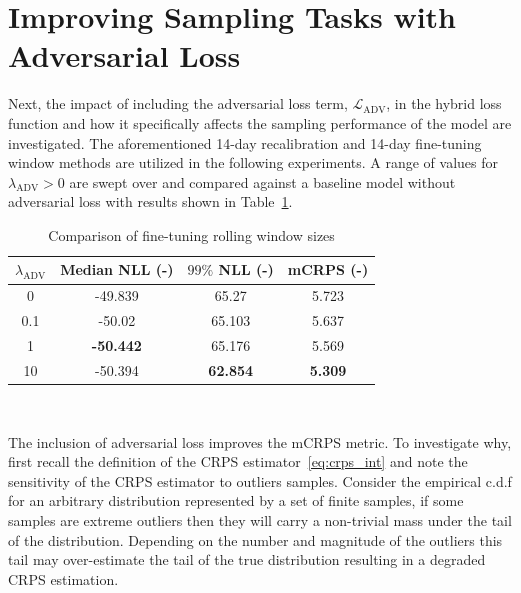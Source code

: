 \section{Improving Sampling Tasks with Adversarial Loss}\label{sec:improving-sampling-tasks}

Next, the impact of including the adversarial loss term, $\mathcal{L}_{\text{ADV}}$, in the hybrid loss function and
how it specifically affects the sampling performance of the model are investigated.
The aforementioned 14-day recalibration and 14-day fine-tuning window methods are utilized in the following experiments.
A range of values for $\lambda_{\text{ADV}} > 0$ are swept over and compared against a baseline model without adversarial
loss with results shown in Table~\ref{tab:ganloss}.

\begin{table}[htb]
    \caption[Results of adversarial loss inclusion]{
        Comparison of fine-tuning rolling window sizes
    }
    \begin{center}
        \begin{tabular}{||c|c|c|c||} \hline
        $\lambda_{\text{ADV}}$ & Median NLL (-)  & $99\%$ NLL (-) & mCRPS (-)  \\	%
        \hline \hline
        0   &         -49.839  &         65.27   &         5.723 \\ \hline
        0.1 &         -50.02   &         65.103  &         5.637 \\ \hline
        1   & \textbf{-50.442} &         65.176  &         5.569 \\ \hline
        10  &         -50.394  & \textbf{62.854} & \textbf{5.309} \\ \hline
        \end{tabular}
        \\ \rule{0mm}{5mm}
    \end{center}
    \label{tab:ganloss}
\end{table}
The inclusion of adversarial loss improves the mCRPS metric.
To investigate why, first recall the definition of the CRPS estimator~\eqref{eq:crps_int} and note the sensitivity of the
CRPS estimator to outliers samples.
Consider the empirical c.d.f for an arbitrary distribution represented by a set of finite samples, if some samples
are extreme outliers then they will carry a non-trivial mass under the tail of the distribution.
Depending on the number and magnitude of the outliers this tail may over-estimate the tail of the true distribution
resulting in a degraded CRPS estimation.

